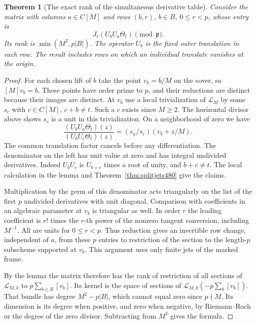 \documentclass[a4paper,11pt]{article}
\newtheorem{theorem}[proposition]{Theorem}
\theoremstyle{definition}
\theoremstyle{remark}
\numberwithin{equation}{section}
\begin{document}
\begin{theorem}[The exact rank of the simultaneous derivative table]\leavevmode
\label{thm:shiftedjets481}
Consider the matrix with columns \(a\in C[M]\) and rows
\((b,r)\), \(b\in B\), \(0\le r<p\), whose entry is
\[
                J_r(U_b U_a\Theta_t)\pmod{\mathfrak p}.
\]
Its rank is \(\min(M^2,p|B|)\). The operator \(U_b\) is the
fixed outer translation in each row. The result includes rows
on which an individual translate vanishes at the origin.
\end{theorem}
\begin{proof}
For each chosen lift of \(b\) take the point \(v_b=b/M\)
on the cover, so \([M]v_b=b\). These points have order prime
to \(p\), and their reductions are distinct because their
images are distinct. At \(v_b\) use a local trivialization of
\(\mathcal L_M\) by some \(s_c\) with \(c\in C[M]\),
\(c+b\ne t\). Such a \(c\) exists since \(M\ge2\).
The horizontal divisor above shows \(s_c\) is a unit in this
trivialization. On a neighborhood of zero we have
\[
 \frac{(U_bU_a\Theta_t)(z)}{(U_bU_c\Theta_t)(z)}
                =(s_a/s_c)(v_b+z/M).
\]
The common translation factor cancels before any differentiation.
The denominator on the left has unit value at zero and has
integral undivided derivatives. Indeed \(U_bU_c\) is \(U_{b+c}\)
times a root of unity, and \(b+c\ne t\). The local calculation
in the lemma and Theorem~\ref{thm:splitjets480} give the claims.

Multiplication by the germ of this denominator acts triangularly
on the list of the first \(p\) undivided derivatives with unit
diagonal. Comparison with coefficients in an algebraic parameter
at \(v_b\) is triangular as well. In order \(r\) the leading
coefficient is \(r!\) times the \(r\)-th power of the nonzero
tangent conversion, including \(M^{-1}\). All are units for
\(0\le r<p\). Thus reduction gives an invertible row change,
independent of \(a\), from these \(p\) entries to restriction of
the section to the length-\(p\) subscheme supported at \(v_b\).
This argument uses only finite jets of the marked frame.

By the lemma the matrix therefore has the rank of restriction of
all sections of \(\mathcal L_{M,k}\) to
\(p\sum_{b\in B}[v_b]\). Its kernel is the space of sections
of \(\mathcal L_{M,k}(-p\sum_b[v_b])\). That bundle has degree
\(M^2-p|B|\), which cannot equal zero since \(p\nmid M\).
Its dimension is its degree when positive, and zero when
negative, by Riemann--Roch or the degree of the zero divisor.
Subtracting from \(M^2\) gives the formula.
\end{proof}
\end{document}
